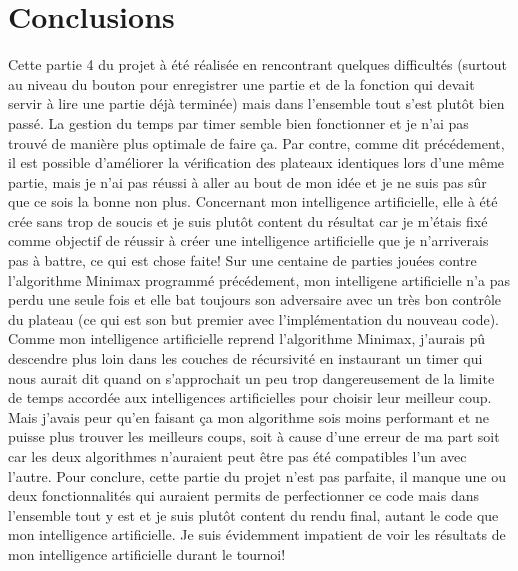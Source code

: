\documentclass{report}
\begin{document}
\chapter{Conclusions}
Cette partie 4 du projet à été réalisée en rencontrant quelques difficultés (surtout au niveau du bouton pour enregistrer une partie et de la fonction qui devait servir à lire une partie déjà terminée) mais dans l'ensemble tout s'est plutôt bien passé.
\newline La gestion du temps par timer semble bien fonctionner et je n'ai pas trouvé de manière plus optimale de faire ça. Par contre, comme dit précédement, il est possible d'améliorer la vérification des plateaux identiques lors d'une même partie, mais je n'ai pas réussi à aller au bout de mon idée et je ne suis pas sûr que ce sois la bonne non plus.
\newline Concernant mon intelligence artificielle, elle à été crée sans trop de soucis et je suis plutôt content du résultat car je m'étais fixé comme objectif de réussir à créer une intelligence artificielle que je n'arriverais pas à battre, ce qui est chose faite! Sur une centaine de parties jouées contre l'algorithme Minimax programmé précédement, mon intelligene artificielle n'a pas perdu une seule fois et elle bat toujours son adversaire avec un très bon contrôle du plateau (ce qui est son but premier avec l'implémentation du nouveau code). 
\newline Comme mon intelligence artificielle reprend l'algorithme Minimax, j'aurais pû descendre plus loin dans les couches de récursivité en instaurant un timer qui nous aurait dit quand on s'approchait un peu trop dangereusement de la limite de temps accordée aux intelligences artificielles pour choisir leur meilleur coup. Mais j'avais peur qu'en faisant ça mon algorithme sois moins performant et ne puisse plus trouver les meilleurs coups, soit à cause d'une erreur de ma part soit car les deux algorithmes n'auraient peut être pas été compatibles l'un avec l'autre.
\newline Pour conclure, cette partie du projet n'est pas parfaite, il manque une ou deux fonctionnalités qui auraient permits de perfectionner ce code mais dans l'ensemble tout y est et je suis plutôt content du rendu final, autant le code que mon intelligence artificielle. Je suis évidemment impatient de voir les résultats de mon intelligence artificielle durant le tournoi!
\end{document}
